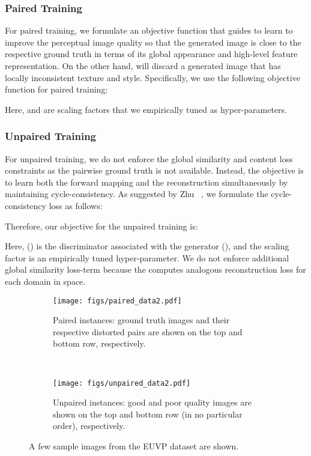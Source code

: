 \documentclass[10pt,twocolumn,letterpaper]{article}
\begin{document}
\subsubsection{Paired Training}
For paired training, we formulate an objective function that guides  to learn to improve the perceptual image quality 
so that the generated image is close to the respective ground truth in terms of its global appearance and high-level feature representation. On the other hand,  will discard a generated image that has locally inconsistent texture and style. Specifically, we use the following objective function for paired training: 

Here,  and  are scaling factors that we empirically tuned as hyper-parameters.


\subsubsection{Unpaired Training}
For unpaired training, we do not enforce the global similarity and content loss constraints as the pairwise ground truth is not available. Instead, the objective is to learn both the forward mapping  and the reconstruction  simultaneously by maintaining cycle-consistency. As suggested by Zhu \etal~\cite{zhu2017unpaired}, we formulate the cycle-consistency loss as follows:   

Therefore, our objective for the unpaired training is: 

Here,  () is the discriminator associated with the generator  (), and the scaling factor  is an empirically tuned hyper-parameter. We do not enforce additional global similarity loss-term because the  computes analogous reconstruction loss for each domain in  space.     


\begin{figure*}[t]
	\centering
	\begin{subfigure}{0.48\textwidth}
		\centering
		\texttt{[image: figs/paired\_data2.pdf]} 
		\caption{Paired instances: ground truth images and their respective distorted pairs are shown on the top and bottom row, respectively.}
	\end{subfigure}~
	\begin{subfigure}{0.48\textwidth} 
		\centering
		\texttt{[image: figs/unpaired\_data2.pdf]} 
		\caption{Unpaired instances: good and poor quality images are shown on the top and bottom row (in no particular order), respectively.}
	\end{subfigure}
	
\caption{A few sample images from the EUVP dataset are shown.}
	\label{fig:data}
\end{figure*}
\end{document}
